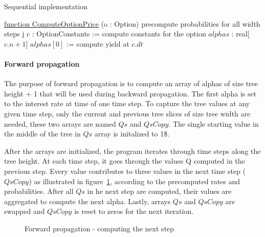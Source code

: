\begin{algorithm}[H]
    \DontPrintSemicolon
    \caption{Sequential implementation\label{alg:sequential}}

    \underline{function ComputeOptionPrice} (o : Option)\;
    \;
    precompute probabilities for all width steps j\;
    $c$ : OptionConstants := compute constants for the option\;
    \;
    $alphas$ : real[$c.n + 1$]\;
    $alphas[0]$ := compute yield at $c.dt$ 
\end{algorithm}

\paragraph{Forward propagation}
The purpose of forward propagation is to compute an array of alphas of size tree height + 1 that will be used during backward propagation. The first alpha is set to the interest rate at time of one time step. To capture the tree values at any given time step, only the current and previous tree slices of size tree width are needed, these two arrays are named $Qs$ and $QsCopy$. The single starting value in the middle of the tree in $Qs$ array is initalized to 1\$.

After the arrays are initialized, the program iterates through time steps along the tree height. At each time step, it goes through the values Q computed in the previous step. Every value contributes to three values in the next time step ($QsCopy$) as illustrated in figure~\ref{fig:seqforward}, according to the precomputed rates and probabilities. After all $Qs$ in he next step are computed, their values are aggregated to compute the next alpha. Lastly, arrays $Qs$ and $QsCopy$ are swapped and $QsCopy$ is reset to zeros for the next iteration.

\begin{figure}[H]
    \centering
    \def\svgwidth{0.5\textwidth}
	\caption{Forward propagation - computing the next step}
    
	\label{fig:seqforward}
\end{figure}


